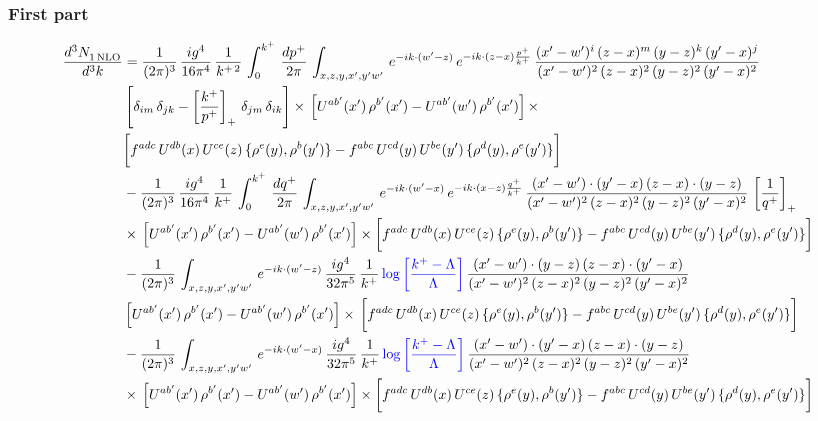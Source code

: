 \documentclass[9pt]{article}
\numberwithin{equation}{section}
\begin{document}
\subsubsection*{First part}
\begin{align}
     \frac{d^{3}N_{1\,\rm NLO}^{\rm}}{d^{3}k}  & = \frac{1}{(2\pi)^{3}}\, \frac{ig^{4}}{16\pi^{4}}\, \frac{1}{k^{+\,2}}\,\int_{0}^{k^{+}}\, \frac{dp^{+}}{2\pi}\,\int_{x,z,y,x',y'w'}\,e^{-ik\cdot (w^\prime-z)}\,e^{-ik\cdot (z-x)\frac{p^{+}}{k^{+}}}\,\frac{(x'-w')^{i}\,(z-x)^{m}\,(y-z)^{k}\,(y'-x)^{j}}{(x'-w')^{2}\,(z-x)^{2}\,(y-z)^{2}\,(y'-x)^{2}}\,\notag \\ & \left[\delta_{im}\,\delta_{jk}-\left[\frac{k^{+}}{p^{+}}\right]_{+}\, \delta_{jm}\,\delta_{ik}\right]\times\, \left[U^{ab'}(x')\,\rho^{b'}(x')-U^{ab'}(w')\,\rho^{b'}(x')\right]\times\notag \\ & \bigg[f^{adc}\,U^{db}(x)\,U^{ce}(z)\, \{\rho^{e}(y),\rho^{b}(y')\}-f^{abc}\,U^{cd}(y)\,U^{be}(y')\, \{\rho^{d}(y),\rho^{e}(y')\}\bigg]\notag \\ & -\frac{1}{(2\pi)^{3}}\, \frac{ig^{4}}{16\pi^{4}}\, \frac{1}{k^{+}}\,\int_{0}^{k^{+}}\, \frac{dq^{+}}{2\pi}\,\int_{x,z,y,x',y'w'}\,e^{-ik\cdot (w^\prime-x)}\,e^{-ik\cdot (x-z)\frac{q^{+}}{k^{+}}}\,\frac{(x'-w')\cdot (y'-x)\,(z-x)\cdot (y-z)}{(x'-w')^{2}\,(z-x)^{2}\,(y-z)^{2}\,(y'-x)^{2}}\,\left[\frac{1}{q^{+}}\right]_{+}\notag \\ & \times\, \left[U^{ab'}(x')\,\rho^{b'}(x')-U^{ab'}(w')\,\rho^{b'}(x')\right]\times \bigg[f^{adc}\,U^{db}(x)\,U^{ce}(z)\, \{\rho^{e}(y),\rho^{b}(y')\}-f^{abc}\,U^{cd}(y)\,U^{be}(y')\, \{\rho^{d}(y),\rho^{e}(y')\}\bigg]\notag \\ & -\frac{1}{(2\pi)^{3}}\, \int_{x,z,y,x',y'w'}\,e^{-ik\cdot (w^\prime-z)}\,\frac{ig^{4}}{32\pi^{5}}\, \frac{1}{k^{+}}\,{\color{blue}\log{\left[\frac{k^{+}-\Lambda}{\Lambda}\right]}}\,\frac{(x'-w')\cdot (y-z)\,(z-x)\cdot (y'-x)}{(x'-w')^{2}\,(z-x)^{2}\,(y-z)^{2}\,(y'-x)^{2}}\,\notag \\ & \left[U^{ab'}(x')\,\rho^{b'}(x')-U^{ab'}(w')\,\rho^{b'}(x')\right]\times\, \bigg[f^{adc}\,U^{db}(x)\,U^{ce}(z)\, \{\rho^{e}(y),\rho^{b}(y')\}-f^{abc}\,U^{cd}(y)\,U^{be}(y')\, \{\rho^{d}(y),\rho^{e}(y')\}\bigg]\notag \\ &  -\frac{1}{(2\pi)^{3}}\, \int_{x,z,y,x',y'w'}\,e^{-ik\cdot (w^\prime-x)}\,\frac{ig^{4}}{32\pi^{5}}\, \frac{1}{k^{+}}\,{\color{blue}\log{\left[\frac{k^{+}-\Lambda}{\Lambda}\right]}}\,\frac{(x'-w')\cdot (y'-x)\,(z-x)\cdot (y-z)}{(x'-w')^{2}\,(z-x)^{2}\,(y-z)^{2}\,(y'-x)^{2}}\notag \\ & \times\, \left[U^{ab'}(x')\,\rho^{b'}(x')-U^{ab'}(w')\,\rho^{b'}(x')\right]\times \bigg[f^{adc}\,U^{db}(x)\,U^{ce}(z)\, \{\rho^{e}(y),\rho^{b}(y')\}-f^{abc}\,U^{cd}(y)\,U^{be}(y')\, \{\rho^{d}(y),\rho^{e}(y')\}\bigg]
\end{align}
\end{document}
